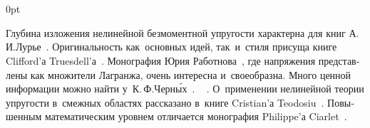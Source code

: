 \section*{\small \wordforbibliography}

\begin{changemargin}{\parindent}{0pt}
\fontsize{10}{12}\selectfont

\begin{otherlanguage}{russian}

Глубина изложения нелинейной безмоментной упругости характерна для книг А.\,И.\:Лурье~\cite{lurie-nonlinearelasticity, lurie-theoryofelasticity}.
%
Оригинальность как~основных идей, так~и~стиля присуща книге Clifford’а Truesdell’а~\cite{truesdell-firstcourse}.
%
Монография Юрия Работнова~\cite{rabotnov-mechanicsofdeformable}, где напряжения представлены как множители Лагранжа, очень интересна и~своеобразна.
%
Много ценной информации можно найти у~К.\,Ф.\:Черн\'{ы}х~\cite{chernyh-nonlinearelasticity}.
%
~\cite{zubov}
.
%
О~применении нелинейной теории упругости в~смежных областях рассказано в~книге Cristian’а Teodosiu~\cite{teodosiu-crystaldefects}.
%
Повышенным математическим уровнем отличается монография Philippe’а Ciarlet~\cite{ciarlet-mathematicalelasticity}.
\par

\end{otherlanguage}

\end{changemargin}
